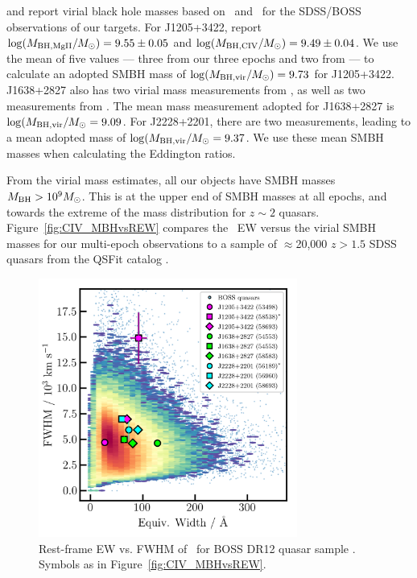 \documentclass[fleqn,usenatbib]{mnras}
\begin{document}
\citet{Shen2011} and \citet{Kozlowski2017} report virial black hole
masses based on \mgii\ and \civ\ for the SDSS/BOSS observations of our
targets. For J1205+3422, \citet{Shen2011} report $\log (M_{\rm BH,
MgII}/M_{\odot}) = 9.55 \pm 0.05$ and $\log(M_{\rm BH, CIV}/M_{\odot})
= 9.49 \pm 0.04$. We use the mean of five values --- three from our
three epochs and two from \citet{Shen2011} --- to calculate an adopted
SMBH mass of $\log (M_{\rm BH, vir}/M_{\odot}) = 9.73$ for J1205+3422.
J1638+2827 also has two virial mass measurements from
\citet{Shen2011}, as well as two measurements from
\citet{Kozlowski2017}. The mean mass measurement adopted for
J1638+2827 is $\log(M_{\rm BH, vir}/M_{\odot} = 9.09$. For J2228+2201,
there are two \citet{Kozlowski2017} measurements, leading to a mean
adopted mass of $\log(M_{\rm BH, vir}/M_{\odot} = 9.37$. We use these
mean SMBH masses when calculating the Eddington ratios.

From the virial mass estimates, all our objects have SMBH masses
$M_{\rm BH} >10^{9} M_{\odot}$.  This is at the upper end of SMBH
masses at all epochs, and towards the extreme of the mass distribution
for $z\sim2$ quasars.  Figure~\ref{fig:CIV_MBHvsREW} compares the
\civ\ EW versus the virial SMBH masses for our multi-epoch
observations to a sample of $\approx$20,000 $z>1.5$ SDSS quasars from
the QSFit catalog \citep{Calderone2017}.

\begin{figure}
  \centering
  \includegraphics[width=8.5cm, trim=0.2cm 0.2cm 0.0cm 0.2cm, clip]
  {figures/CIV_CLQs_REWvsFWHM_20200519.png}
  \vspace{-12pt}
  \caption[]{Rest-frame EW vs. FWHM of \civ\
    for BOSS DR12 quasar sample \citep{Hamann2017}.
   Symbols as in Figure~\ref{fig:CIV_MBHvsREW}.}
  \label{fig:REWvsFWHM}
\end{figure}
\end{document}
